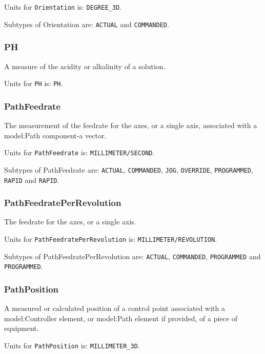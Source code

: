 Units for \texttt{Orientation} is: \texttt{DEGREE_3D}.


Subtypes of Orientation are: \texttt{ACTUAL} and \texttt{COMMANDED}. 
\FloatBarrier

\subsubsection{PH}
  \label{sec:PH}


A measure of the acidity or alkalinity of a solution.


Units for \texttt{PH} is: \texttt{PH}.

\FloatBarrier

\subsubsection{PathFeedrate}
  \label{sec:PathFeedrate}


The measurement of the feedrate for the axes, or a single axis, associated with a {model:Path} component-a vector.


Units for \texttt{PathFeedrate} is: \texttt{MILLIMETER/SECOND}.


Subtypes of PathFeedrate are: \texttt{ACTUAL}, \texttt{COMMANDED}, \texttt{JOG}, \texttt{OVERRIDE}, \texttt{PROGRAMMED}, \texttt{RAPID} and \texttt{RAPID}. 
\FloatBarrier

\subsubsection{PathFeedratePerRevolution}
  \label{sec:PathFeedratePerRevolution}


The feedrate for the axes, or a single axis.


Units for \texttt{PathFeedratePerRevolution} is: \texttt{MILLIMETER/REVOLUTION}.


Subtypes of PathFeedratePerRevolution are: \texttt{ACTUAL}, \texttt{COMMANDED}, \texttt{PROGRAMMED} and \texttt{PROGRAMMED}. 
\FloatBarrier

\subsubsection{PathPosition}
  \label{sec:PathPosition}


A measured or calculated position of a control point associated with a {model:Controller} element, or {model:Path} element if provided, of a piece of equipment.


Units for \texttt{PathPosition} is: \texttt{MILLIMETER_3D}.


